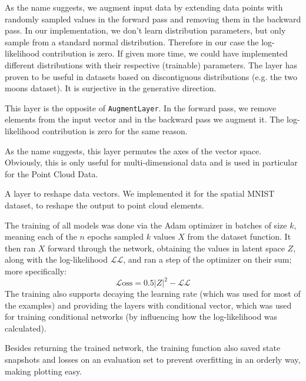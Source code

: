As the name suggests, we augment input data by extending data points with randomly sampled values in the forward pass and removing them in the backward pass. In our implementation, we don't learn distribution parameters, but only sample from a standard normal distribution. Therefore in our case the log-likelihood contribution is zero. If given more time, we could have implemented different distributions with their respective (trainable) parameters. The layer has proven to be useful in datasets based on discontiguous distributions (e.g. the two moons dataset). It is surjective in the generative direction.


This layer is the opposite of \texttt{AugmentLayer}. In the forward pass, we remove elements from the input vector and in the backward pass we augment it. The log-likelihood contribution is zero for the same reason.

\label{sec:permute_axes_layer}
As the name suggests, this layer permutes the axes of the vector space. Obviously, this is only useful for multi-dimensional data and is used in particular for the Point Cloud Data.


\label{sec:reshape_layer}
A layer to reshape data vectors. We implemented it for the spatial MNIST dataset, to reshape the output to point cloud elements.


The training of all models was done via the Adam optimizer in batches of size $k$, meaning each of the $n$ epochs sampled $k$ values $X$ from the dataset function.
It then ran $X$ forward through the network, obtaining the values in latent space $Z$, along with the log-likelihood $\mathcal{LL}$, and ran a step of the optimizer on their sum; more specifically: $$\mathcal{L}\text{oss} = 0.5 |Z|^2 - \mathcal{LL}$$
The training also supports decaying the learning rate (which was used for most of the examples) and providing the layers with conditional vector, which was used for training conditional networks (by influencing how the log-likelihood was calculated).

Besides returning the trained network, the training function also saved state snapshots and losses on an evaluation set to prevent overfitting in an orderly way, making plotting easy. 


